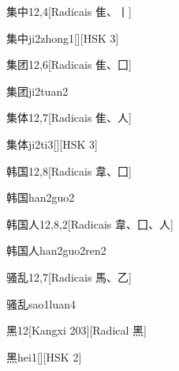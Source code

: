 \begin{entry}{集中}{12,4}[Radicais ⾫、⼁]
  \begin{phonetics}{集中}{ji2zhong1}[][HSK 3]
  \end{phonetics}
\end{entry}

\begin{entry}{集团}{12,6}[Radicais ⾫、⼞]
  \begin{phonetics}{集团}{ji2tuan2}
  \end{phonetics}
\end{entry}

\begin{entry}{集体}{12,7}[Radicais ⾫、⼈]
  \begin{phonetics}{集体}{ji2ti3}[][HSK 3]
  \end{phonetics}
\end{entry}

\begin{entry}{韩国}{12,8}[Radicais ⾱、⼞]
  \begin{phonetics}{韩国}{han2guo2}
  \end{phonetics}
\end{entry}

\begin{entry}{韩国人}{12,8,2}[Radicais ⾱、⼞、⼈]
  \begin{phonetics}{韩国人}{han2guo2ren2}
  \end{phonetics}
\end{entry}

\begin{entry}{骚乱}{12,7}[Radicais ⾺、⼄]
  \begin{phonetics}{骚乱}{sao1luan4}
  \end{phonetics}
\end{entry}

\begin{entry}{黑}{12}[Kangxi 203][Radical ⿊]
  \begin{phonetics}{黑}{hei1}[][HSK 2]
  \end{phonetics}
\end{entry}

